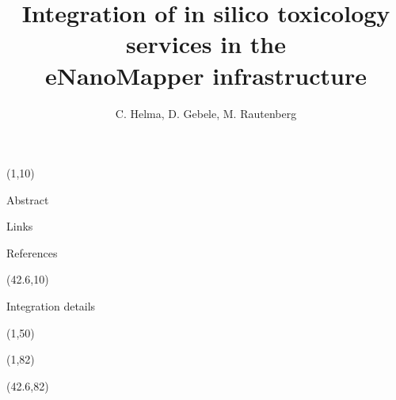\documentclass[final]{beamer}
\title{Integration of in silico toxicology services in the \\ eNanoMapper infrastructure }
\author{C. Helma, D. Gebele, M. Rautenberg}
\institute{\emph{in silico} toxicology gmbh, Basel, Switzerland}
\begin{document}
  \begin{frame}{}

    \begin{textblock}{40.5}(1,10)
      \begin{block}{Abstract}
        
      \end{block}

      \begin{exampleblock}{Links}
        
      \end{exampleblock}


      \begin{block}{References}
        \small
      \end{block}

    \end{textblock}

    \begin{textblock}{40.5}(42.6,10)

      \begin{block}{Integration details}
        
      \end{block}

    \end{textblock}



    \begin{textblock}{82.1}(1,50)
      
    \end{textblock}

    \begin{textblock}{40.5}(1,82)


    \end{textblock}

    \begin{textblock}{40.5}(42.6,82)


    \end{textblock}


  \end{frame}
\end{document}

